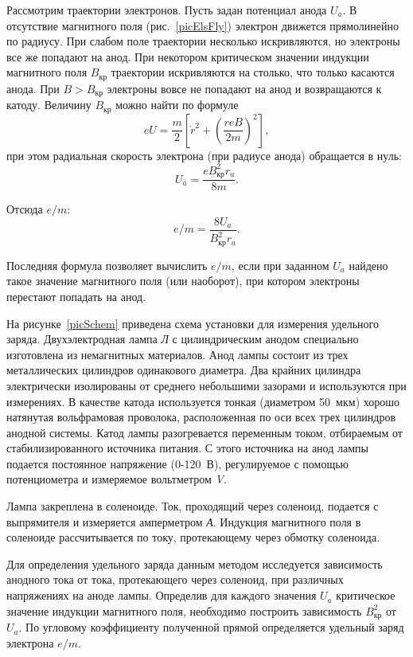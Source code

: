 \documentclass[pscyr,titlepage]{hedreport}
\begin{document}
  Рассмотрим траектории электронов. Пусть задан потенциал анода \( U_a \). В
  отсутствие магнитного поля (рис.~\ref{picElsFly}) электрон движется
  прямолинейно по радиусу. При слабом поле траектории несколько искривляются, но
  электроны все же попадают на анод. При некотором критическом значении индукции
  магнитного поля \( B_\text{кр} \) траектории искривляются на столько, что
  только касаются анода. При \( B > B_\text{кр} \) электроны вовсе не попадают
  на анод и возвращаются к катоду. Величину \( B_\text{кр} \) можно найти по
  формуле
  \[
    eU = \frac{m}{2}\left[ \dot{r}^2 + \left( \frac{reB}{2m} \right)^2 \right],
  \]
  при этом радиальная скорость электрона (при радиусе анода) обращается в нуль:
  \[
    U_a = \frac{e B_\text{кр}^2 r_a}{8m}.
  \]

  Отсюда \( e/m \):
  \[
    e/m = \frac{8U_a}{B_\text{кр}^2 r_a}.
  \]

  Последняя формула позволяет вычислить \( e/m \), если при заданном \( U_a \)
  найдено такое значение магнитного поля (или наоборот), при котором электроны
  перестают попадать на анод.

  На рисунке~\ref{picSchem} приведена схема установки для измерения удельного
  заряда. Двухэлектродная лампа \emph{Л} с цилиндрическим анодом специально
  изготовлена из немагнитных материалов. Анод лампы состоит из трех
  металлических цилиндров одинакового диаметра. Два крайних цилиндра
  электрически изолированы от среднего небольшими зазорами и используются при
  измерениях. В качестве катода используется тонкая (диаметром 50~мкм) хорошо
  натянутая вольфрамовая проволока, расположенная по оси всех трех цилиндров
  анодной системы. Катод лампы разогревается переменным током, отбираемым от
  стабилизированного источника питания. С этого источника на анод лампы подается
  постоянное напряжение (0-120~В), регулируемое с помощью потенциометра и
  измеряемое вольтметром \emph{V}.

  Лампа закреплена в соленоиде. Ток, проходящий через соленоид, подается с
  выпрямителя и измеряется амперметром \emph{А}. Индукция магнитного поля в
  соленоиде рассчитывается по току, протекающему через обмотку соленоида.

  Для определения удельного заряда данным методом исследуется зависимость
  анодного тока от тока, протекающего через соленоид, при различных напряжениях
  на аноде лампы. Определив для каждого значения \( U_a \) критическое значение
  индукции магнитного поля, необходимо построить зависимость \( B_\text{кр}^2 \)
  от \( U_a \). По угловому коэффициенту полученной прямой определяется удельный
  заряд электрона \( e/m \).
\end{document}
